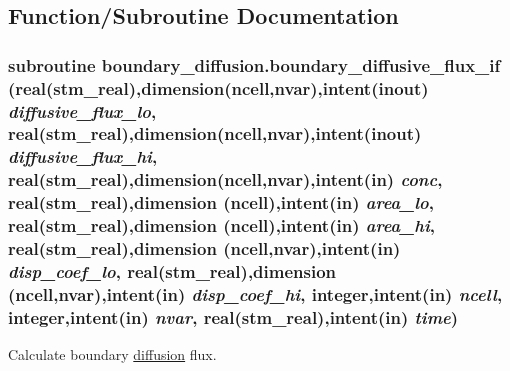 \subsection{Function/Subroutine Documentation}
\hypertarget{a00051_5540992a4e125d1b4affb67bb805df11}{
\subsubsection[{boundary\_\-diffusive\_\-flux\_\-if}]{\setlength{\rightskip}{0pt plus 5cm}subroutine boundary\_\-diffusion.boundary\_\-diffusive\_\-flux\_\-if (real(stm\_\-real),dimension(ncell,nvar),intent(inout) {\em diffusive\_\-flux\_\-lo}, \/  real(stm\_\-real),dimension(ncell,nvar),intent(inout) {\em diffusive\_\-flux\_\-hi}, \/  real(stm\_\-real),dimension(ncell,nvar),intent(in) {\em conc}, \/  real(stm\_\-real),dimension         (ncell),intent(in) {\em area\_\-lo}, \/  real(stm\_\-real),dimension         (ncell),intent(in) {\em area\_\-hi}, \/  real(stm\_\-real),dimension (ncell,nvar),intent(in) {\em disp\_\-coef\_\-lo}, \/  real(stm\_\-real),dimension (ncell,nvar),intent(in) {\em disp\_\-coef\_\-hi}, \/  integer,intent(in) {\em ncell}, \/  integer,intent(in) {\em nvar}, \/  real(stm\_\-real),intent(in) {\em time})}}
\label{a00051_5540992a4e125d1b4affb67bb805df11}


Calculate boundary \hyperlink{a00053}{diffusion} flux. 

